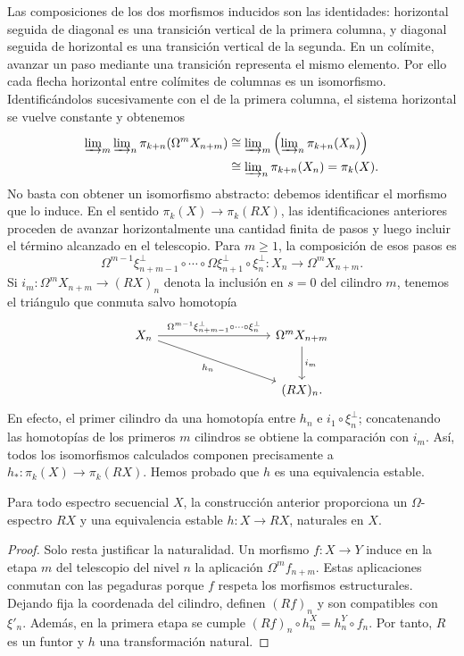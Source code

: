 Las composiciones de los dos morfismos inducidos son las identidades: horizontal seguida de diagonal es una transición vertical de la primera columna, y diagonal seguida de horizontal es una transición vertical de la segunda. En un colímite, avanzar un paso mediante una transición representa el mismo elemento. Por ello cada flecha horizontal entre colímites de columnas es un isomorfismo. Identificándolos sucesivamente con el de la primera columna, el sistema horizontal se vuelve constante y obtenemos
\[
\begin{aligned}
\varinjlim\nolimits_m\varinjlim\nolimits_n
\pi_{k+n}(\Omega^mX_{n+m})
&\cong\varinjlim\nolimits_m
\left(\varinjlim\nolimits_n\pi_{k+n}(X_n)\right)\\
&\cong\varinjlim\nolimits_n\pi_{k+n}(X_n)
=\pi_k(X).
\end{aligned}
\]
No basta con obtener un isomorfismo abstracto: debemos identificar el morfismo que lo induce. En el sentido $\pi_k(X)\to\pi_k(RX)$, las identificaciones anteriores proceden de avanzar horizontalmente una cantidad finita de pasos y luego incluir el término alcanzado en el telescopio. Para $m\ge1$, la composición de esos pasos es
\[
\Omega^{m-1}\xi_{n+m-1}^{\perp}\circ\cdots
\circ\Omega\xi_{n+1}^{\perp}\circ\xi_n^{\perp}
\colon X_n\longrightarrow\Omega^mX_{n+m}.
\]
Si $i_m\colon\Omega^mX_{n+m}\to(RX)_n$ denota la inclusión en $s=0$ del cilindro $m$, tenemos el triángulo que conmuta salvo homotopía
\[
\begin{tikzcd}[column sep=9em,row sep=large]
X_n
\arrow[r,"\Omega^{m-1}\xi_{n+m-1}^{\perp}\circ\cdots\circ\xi_n^{\perp}"]
\arrow[dr,"h_n"']
& \Omega^mX_{n+m} \arrow[d,"i_m"]\\
& (RX)_n.
\end{tikzcd}
\]
En efecto, el primer cilindro da una homotopía entre $h_n$ e $i_1\circ\xi_n^{\perp}$; concatenando las homotopías de los primeros $m$ cilindros se obtiene la comparación con $i_m$. Así, todos los isomorfismos calculados componen precisamente a $h_*\colon\pi_k(X)\to\pi_k(RX)$. Hemos probado que $h$ es una equivalencia estable.

\begin{prop}\label{prop:c10-reemplazo-omega}
Para todo espectro secuencial $X$, la construcción anterior proporciona un $\Omega$-espectro $RX$ y una equivalencia estable $h\colon X\to RX$, naturales en $X$.
\end{prop}
\begin{proof}
Solo resta justificar la naturalidad. Un morfismo $f\colon X\to Y$ induce en la etapa $m$ del telescopio del nivel $n$ la aplicación $\Omega^m f_{n+m}$. Estas aplicaciones conmutan con las pegaduras porque $f$ respeta los morfismos estructurales. Dejando fija la coordenada del cilindro, definen $(Rf)_n$ y son compatibles con $\xi'_n$. Además, en la primera etapa se cumple $(Rf)_n\circ h_n^X=h_n^Y\circ f_n$. Por tanto, $R$ es un funtor y $h$ una transformación natural.
\end{proof}

